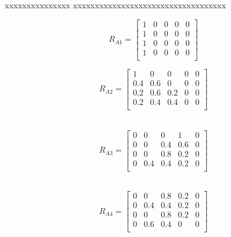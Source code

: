 \documentclass{beamer}
\begin{document}
\begin{frame}{xxxxxxxxxxxxxxx}
	xxxxxxxxxxxxxxxxxxxxxxxxxxxxxxxxxxx
	
	\begin{minipage}{0.47\linewidth}	
		\scriptsize
		\begin{equation}
			R_{A1}=\left[ \begin{matrix}
				1 & 0 & 0 & 0 & 0 \\
				1 &  0 &  0  &  0  & 0 \\
				1 &  0  &  0 &  0  & 0 \\
				1 &  0  &  0  &  0  & 0 \\
			\end{matrix} \right] 
		\end{equation}	
	\end{minipage}
	\begin{minipage}{0.47\linewidth}
		\scriptsize
		\begin{equation}
			R_{A2}=\left[ \begin{matrix}
				1 &  0 &  0  &  0  & 0 \\
				0.4 &  0.6  &  0  &  0  & 0 \\ 
				0.2 &  0.6  &  0.2  &  0  & 0 \\ 
				0.2 &  0.4  &  0.4  &  0  & 0 \\ 
			\end{matrix} \right] 
		\end{equation}
	\end{minipage}

	\begin{minipage}{0.47\linewidth}
　\scriptsize
\begin{equation}
	R_{A3}=\left[ \begin{matrix}
		0 &  0  &  0  &  1  & 0 \\
		0 &  0  &  0.4  &  0.6  & 0 \\
		0 &  0  &  0.8  &  0.2  & 0 \\
		0 &  0.4  &  0.4  &  0.2  & 0 \\
	\end{matrix} \right] 
\end{equation}
	\end{minipage}	
	\begin{minipage}{0.47\linewidth}
　\scriptsize
\begin{equation}
	R_{A4}=\left[ \begin{matrix}
		0 &  0  &  0.8  &  0.2  & 0 \\
		0 &  0.4  &  0.4  &  0.2  & 0 \\
		0 &  0  &  0.8  &  0.2  & 0 \\
		0 & 0.6 & 0.4 & 0 & 0 \\
	\end{matrix} \right] 
\end{equation}
\end{minipage}



\end{frame}
\end{document}
